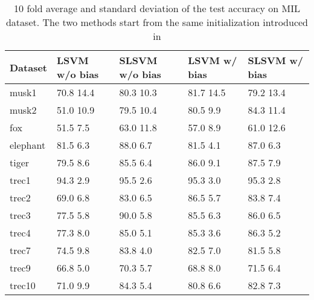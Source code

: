 \documentclass{article}
\begin{document}
\begin{table*}[htbp]
\footnotesize
\centering
\renewcommand{\arraystretch}{1.1}
\renewcommand{\tabcolsep}{1.5mm}
\begin{tabular}{*{5}{l}}
\toprule
Dataset& LSVM w/o bias & SLSVM w/o bias &LSVM w/ bias & SLSVM w/ bias\\
\midrule
musk1    &  70.8  14.4 &  80.3  10.3  &  81.7  14.5  &  79.2  13.4 \\
musk2    &  51.0  10.9 &  79.5  10.4  &  80.5  9.9    &  84.3  11.4 \\
\midrule
fox           &  51.5  7.5   &  63.0  11.8  &  57.0  8.9   &  61.0  12.6 \\
elephant & 81.5  6.3   &  88.0  6.7    &  81.5  4.1    &  87.0  6.3 \\
tiger        &  79.5  8.6   &  85.5  6.4    &  86.0  9.1    &  87.5  7.9 \\
\midrule
trec1       &  94.3  2.9    &  95.5  2.6   &  95.3  3.0   &  95.3  2.8 \\
trec2       &  69.0  6.8    &  83.0  6.5   &  86.5  5.7   &  83.8  7.4 \\
trec3       &  77.5  5.8    &  90.0  5.8   &  85.5  6.3   &  86.0  6.5 \\
trec4       &  77.3  8.0    &  85.0  5.1   &  85.3  3.6   &  86.3  5.2  \\
trec7       &  74.5  9.8    &  83.8  4.0   &  82.5  7.0   & 81.5  5.8  \\
trec9       &  66.8  5.0    &  70.3  5.7   &  68.8  8.0   & 71.5  6.4 \\
trec10     &  71.0  9.9    &  84.3  5.4   &  80.8  6.6   & 82.8  7.3  \\
\bottomrule
\end{tabular}
\caption{10 fold average and standard deviation of the test accuracy on MIL dataset. The two methods start from the same initialization introduced in \cite{misvm-nips}}
\label{tab:mil-experiments}
\end{table*}
\end{document}
